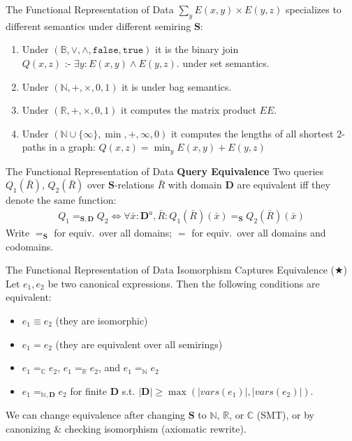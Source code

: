 \documentclass{beamer}
\newcommand{\C}{\mathbb C} %
\newcommand{\N}{\mathbb N} %
\newcommand{\R}{\mathbb R} %
\newcommand{\D}{\mathbf D} %
\newcommand{\SR}{\mathbf S} %
\newcommand{\dleq}{\mbox{ :- }}
\newcommand{\set}[1]{\{#1\}}                    %
\begin{document}
  \begin{frame}{The Functional Representation of Data}
    $\sum_y E(x, y) \times E(y, z)$ specializes to 
    different semantics under different semiring $\SR$:
    \begin{enumerate}
      \item Under $(\mathbb{B},\vee, \wedge, \texttt{false}, \texttt{true})$
          it is the binary join $Q(x, z) \dleq \exists y: E(x, y) \wedge E(y, z).$ 
          under set semantics. \pause
      \item Under $(\mathbb{N}, +, \times, 0, 1)$ it is under
          bag semantics. \pause
      \item Under $(\mathbb{R}, +, \times, 0, 1)$ it computes the matrix product $EE$. \pause
      \item Under $(\mathbb{N} \cup \set{\infty}, \min, +, \infty, 0)$ it computes the lengths
          of all shortest 2-paths in a graph:
          $Q(x, z) = \min_y E(x, y) + E(y, z)$
  \end{enumerate}
  \end{frame}

  \begin{frame}{The Functional Representation of Data}
    \textbf{Query Equivalence} Two queries
    $Q_1({\bar R})$, $Q_2({\bar R})$
    over $\SR$-relations ${\bar R}$ with domain $\mathbf{D}$
    are equivalent iff
    they denote the same function:
    \begin{align*}
    Q_1 =_{\SR,\D} Q_2 \iff
    \forall {\bar x}:\D^a, {\bar R} :
    Q_1({\bar R})({\bar x}) =_{\SR}
    Q_2({\bar R})({\bar x})
    \end{align*} \pause
    Write $=_{\SR}$ for equiv.~over all domains;
    $=$ for equiv.~over all domains and codomains.
  \end{frame}

  \begin{frame}{The Functional Representation of Data}
    \alert{Isomorphism Captures Equivalence} ($\bigstar$)~\cite{spores}
    Let $e_1, e_2$ be two  canonical expressions.
    Then the following conditions are equivalent:
    \begin{itemize}
    \item \label{item:1} $e_1 \equiv e_2$ (they are isomorphic)
    \item \label{item:2} $e_1 = e_2$ (they are equivalent over all semirings)
    \item \label{item:3} $e_1 =_\C e_2$, $e_1 =_\R e_2$, and $e_1 =_\N e_2$
    \item \label{item:6} $e_1 =_{\N, \D} e_2$ for finite $\D$
    s.t. $|\D| \geq \max(|vars(e_1)|, |vars(e_2)|)$.
    \end{itemize} \pause
    We can change equivalence after changing $\SR$ to $\N$, $\R$, or $\C$ (SMT),
    or by canonizing \& checking isomorphism (axiomatic rewrite).
  \end{frame}
\end{document}
